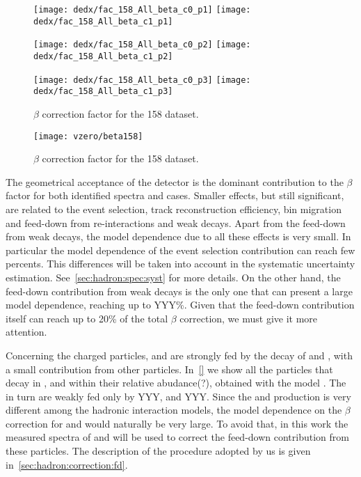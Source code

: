 \begin{figure}
  \centering
  \texttt{[image: dedx/fac\_158\_All\_beta\_c0\_p1]}
  \texttt{[image: dedx/fac\_158\_All\_beta\_c1\_p1]}

  \texttt{[image: dedx/fac\_158\_All\_beta\_c0\_p2]}
  \texttt{[image: dedx/fac\_158\_All\_beta\_c1\_p2]}

  \texttt{[image: dedx/fac\_158\_All\_beta\_c0\_p3]}
  \texttt{[image: dedx/fac\_158\_All\_beta\_c1\_p3]}

  \caption{$\beta$ correction factor for the 158 \GeVc dataset.}
  \label{fig:hadron:correction:beta:dedx158}
\end{figure}

\begin{figure}
  \centering
  \texttt{[image: vzero/beta158]}
  
  \caption{$\beta$ correction factor for the 158 \GeVc dataset.}
  \label{fig:hadron:correction:beta:vzero158}
\end{figure}

The geometrical acceptance of the detector
is the dominant contribution to the $\beta$ factor
for both identified spectra and \vzero cases.
Smaller effects, but still significant, are related
to the event selection, track reconstruction efficiency, 
bin migration and feed-down from re-interactions and weak decays.
Apart from the feed-down from weak decays,
the model dependence due to all these effects is very small.
In particular the model dependence of the event selection
contribution can reach few percents. This differences
will be taken into account in the systematic uncertainty estimation.
See~\cref{sec:hadron:spec:syst} for more details.
On the other hand, the feed-down contribution from weak decays
is the only one that can present a large model
dependence, reaching up to YYY\%.  
Given that the feed-down contribution itself
can reach up to 20\% of the total $\beta$
correction, we must give it more attention.


Concerning the charged particles, \pions and \protons
are strongly fed by the decay of \lambs and \kzeros,
with a small contribution from other particles.
In~\cref{} we show all the particles that decay in
\pions, \kaons and \protons within their relative abudance(?),
obtained with the model \EposLong.
The \kaons in turn are weakly fed only by YYY, and YYY.
Since the \lambs and \kzeros production is very different
among the hadronic interaction models, the model dependence
on the $\beta$ correction for \pions and \protons would
naturally be very large. To avoid that, in this work the
measured spectra of \lambs and \kzeros will be used
to correct the feed-down contribution from these particles.
The description of the procedure adopted by us is given
in~\cref{sec:hadron:correction:fd}.


